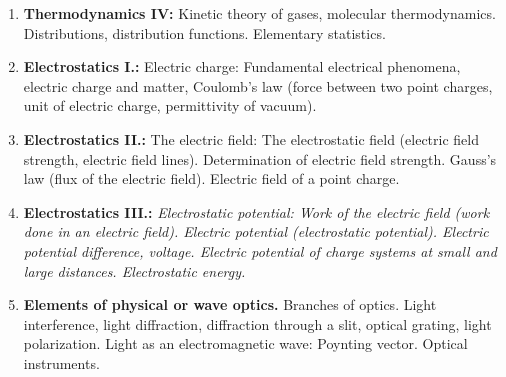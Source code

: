 \documentclass[t,aspectratio=169]{beamer}
\begin{document}
\begin{frame}
\begin{enumerate}
\item \textbf{Thermodynamics IV:} Kinetic theory of gases, molecular thermodynamics. Distributions, distribution functions. Elementary statistics.
\item \textbf{Electrostatics I.:} Electric charge: Fundamental electrical phenomena, electric charge and matter, Coulomb’s law (force between two point charges, unit of electric charge, permittivity of vacuum).
\item \textbf{Electrostatics II.:} The electric field: The electrostatic field (electric field strength, electric field lines). Determination of electric field strength. Gauss’s law (flux of the electric field). Electric field of a point charge.
\pagebreak
\item \textbf{Electrostatics III.:} \textit{Electrostatic potential: Work of the electric field (work done in an electric field). Electric potential (electrostatic potential). Electric potential difference, voltage. Electric potential of charge systems at small and large distances. Electrostatic energy.}
\item \textbf{Elements of physical or wave optics.} Branches of optics. Light interference, light diffraction, diffraction through a slit, optical grating, light polarization. Light as an electromagnetic wave: Poynting vector. Optical instruments.
\end{enumerate}
\end{frame}

\end{document}
